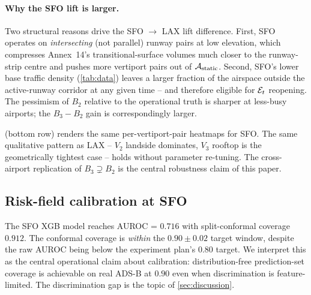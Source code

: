 \paragraph{Why the SFO lift is larger.}
Two structural reasons drive the SFO $\to$ LAX lift difference. First, SFO
operates on \emph{intersecting} (not parallel) runway pairs at low elevation,
which compresses Annex~14's transitional-surface volumes much closer to the
runway-strip centre and pushes more vertiport pairs out of $\mathcal{A}_{\mathrm{static}}$.
Second, SFO's lower base traffic density (\cref{tab:data}) leaves a larger
fraction of the airspace outside the active-runway corridor at any given
time -- and therefore eligible for $\mathcal{E}_t$ reopening. The pessimism of
$B_2$ relative to the operational truth is sharper at less-busy airports;
the $B_3-B_2$ gain is correspondingly larger.

 (bottom row) renders the same per-vertiport-pair
heatmaps for SFO. The same qualitative pattern as LAX -- $V_2$ landside
dominates, $V_3$ rooftop is the geometrically tightest case -- holds without
parameter re-tuning. The cross-airport replication of $B_3 \supsetneq B_2$
is the central robustness claim of this paper.

\subsection{Risk-field calibration at SFO}
\label{sec:sfo-risk}

The SFO XGB model reaches AUROC = $0.716$ with split-conformal coverage
$0.912$. The conformal coverage is \emph{within} the $0.90 \pm 0.02$ target
window, despite the raw AUROC being below the experiment plan's $0.80$
target. We interpret this as the central operational claim about
calibration: distribution-free prediction-set coverage is achievable on real
ADS-B at $0.90$ even when discrimination is feature-limited. The
discrimination gap is the topic of \cref{sec:discussion}.
